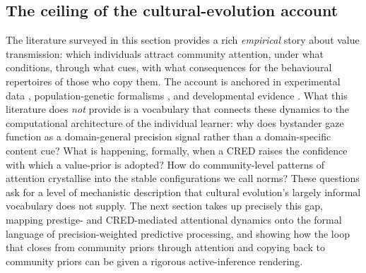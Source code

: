 \subsection*{The ceiling of the cultural-evolution account}

The literature surveyed in this section provides a rich \emph{empirical} story
about value transmission: which individuals attract community attention, under
what conditions, through what cues, with what consequences for the behavioural
repertoires of those who copy them.
The account is anchored in experimental data \citep{chudek2012BystanderGaze},
population-genetic formalisms \citep{henrichChudekBoyd2015BigMan,egoziRam2024PrestigeFormal},
and developmental evidence \citep{heyes2018CognitiveGadgets,heyes2024NormPsychology}.
What this literature does \emph{not} provide is a vocabulary that connects these
dynamics to the computational architecture of the individual learner: why does
bystander gaze function as a domain-general precision signal rather than a
domain-specific content cue?
What is happening, formally, when a CRED raises the confidence with which a
value-prior is adopted?
How do community-level patterns of attention crystallise into the stable
configurations we call norms?
These questions ask for a level of mechanistic description that cultural
evolution's largely informal vocabulary does not supply.
The next section takes up precisely this gap, mapping prestige- and
CRED-mediated attentional dynamics onto the formal language of
precision-weighted predictive processing, and showing how the loop that closes
from community priors through attention and copying back to community priors can
be given a rigorous active-inference rendering.
